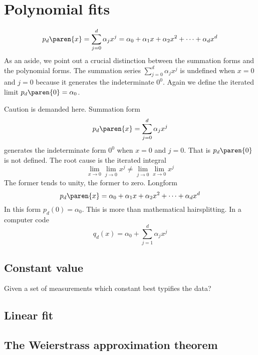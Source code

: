 \chapter{Polynomial fits}

  \begin{equation}
    p_{d}\paren{x} = \sum_{j=0}^{d} \alpha_{j} x^{j} = \alpha_{0} + \alpha_{1}x + \alpha_{2}x^{2} + \cdots + \alpha_{d}x^{d}
  \end{equation}
As an aside, we point out a crucial distinction between the summation forms and the polynomial forms. The summation series $\sum_{j=0}^{d} \alpha_{j} x^{j}$ is undefined when $x=0$ and $j=0$ because it generates the indeterminate $0^{0}$. Again we define the iterated limit $p_{d}\paren{0} = \alpha_{0}$.

Caution is demanded here.  Summation form
  \begin{equation}
    p_{d}\paren{x} = \sum_{j=0}^{d} \alpha_{j} x^{j}
    \label{eqn:summation form}
  \end{equation}
generates the indeterminate	form $0^{0}$ when $x=0$ and $j=0$. That is $p_{d}\paren{0}$ is not defined. The root cause is the iterated integral
  \begin{equation}
    \lim_{x\rightarrow 0} \lim_{j\rightarrow 0} x^{j} \ne \lim_{j\rightarrow 0} \lim_{x\rightarrow 0} x^{j}
  \end{equation}
The former tends to unity, the former to zero.
Longform
  \begin{equation}
    p_{d}\paren{x} = \alpha_{0} + \alpha_{1}x + \alpha_{2}x^{2} + \cdots + \alpha_{d}x^{d}
  \end{equation}
In this form $p_{d}(0) = \alpha_{0}$.
This is more than mathematical hairsplitting. In a computer code
  \begin{equation}
    q_{d}(x) = \alpha_{0} + \sum_{j=1}^{d} \alpha_{j} x^{j}
  \end{equation}

\section{Constant value}
Given a set of measurements which constant best typifies the data?

\section{Linear fit}

\section{The Weierstrass approximation theorem}





\endinput  %